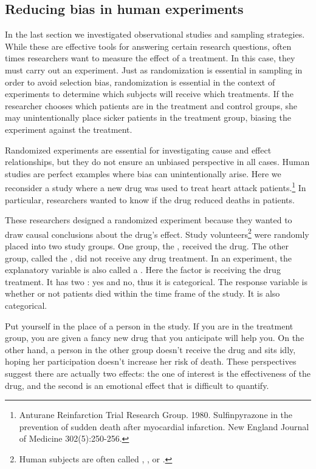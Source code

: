 \subsection{Reducing bias in human experiments}
\label{biasInHumanExperiments}

In the last section we investigated observational studies and sampling strategies. While these are effective tools for answering certain research questions, often times researchers want to measure the effect of a treatment. In this case, they must carry out an experiment. Just as randomization is essential in sampling in order to avoid selection bias, randomization is essential in the context of experiments to determine which subjects will receive which treatments. If the researcher chooses which patients are in the treatment and control groups, she may unintentionally place sicker patients in the treatment group, biasing the experiment against the treatment.

Randomized experiments are essential for investigating cause and effect relationships, but they do not ensure an unbiased perspective in all cases. Human studies are perfect examples where bias can unintentionally arise. Here we reconsider a study where a new drug was used to treat heart attack patients.\footnote{Anturane Reinfarction Trial Research Group. 1980. Sulfinpyrazone in the prevention of sudden death after myocardial infarction. New England Journal of Medicine 302(5):250-256.} In particular, researchers wanted to know if the drug reduced deaths in patients.

These researchers designed a randomized experiment because they wanted to draw causal conclusions about the drug's effect. Study volunteers\footnote{Human subjects are often called , , or .} were randomly placed into two study groups. One group, the , received the drug. The other group, called the , did not receive any drug treatment. In an experiment, the explanatory variable is also called a . Here the factor is receiving the drug treatment. It has two : yes and no, thus it is categorical. The response variable is whether or not patients died within the time frame of the study. It is also categorical.

Put yourself in the place of a person in the study. If you are in the treatment group, you are given a fancy new drug that you anticipate will help you. On the other hand, a person in the other group doesn't receive the drug and sits idly, hoping her participation doesn't increase her risk of death. These perspectives suggest there are actually two effects: the one of interest is the effectiveness of the drug, and the second is an emotional effect that is difficult to quantify.


